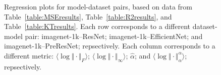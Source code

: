 \begin{figure}[t]
{        \label{fig:summary_regressions_A_10}
    }
    \caption{Regression plots for model-dataset pairs, based on data from Table~\ref{table:MSEresults}, Table~\ref{table:R2results}, and Table~\ref{table:KTresults}.
             Each row corresponds to a different dataset-model pair:
             imagenet-1k--ResNet; 
             imagenet-1k--EfficientNet; 
             and 
             imagenet-1k--PreResNet; 
             repsectively.
             Each column corresponds to a different metric:
             $\langle\log\Vert\cdot\Vert_{F}\rangle$; 
             $\langle\log\Vert\cdot\Vert_{\infty}\rangle$; 
             $\hat{\alpha}$; 
             and
             $\langle\log\Vert\cdot\Vert^{\alpha}_{\alpha}\rangle$;
             repsectively.
            }
    \label{fig:summary_regressions_A}
\end{figure}

